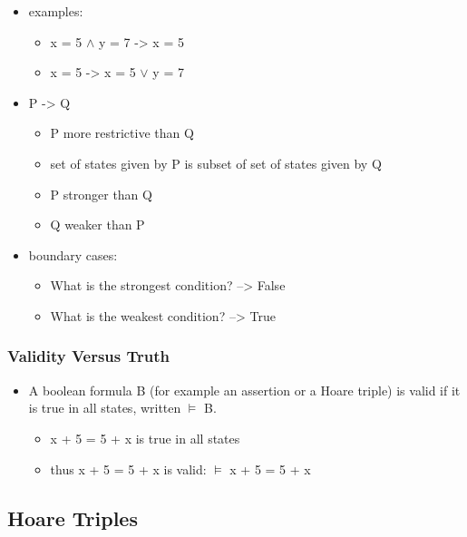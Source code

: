 \begin{itemize}
\tightlist
\item
  examples:

  \begin{itemize}
  \tightlist
  \item
    x = 5 $\land$ y = 7 -\textgreater{} x = 5
  \item
    x = 5 -\textgreater{} x = 5 $\lor$ y = 7
  \end{itemize}
\item
  P -\textgreater{} Q

  \begin{itemize}
  \tightlist
  \item
    P more restrictive than Q
  \item
    set of states given by P is subset of set of states given by Q
  \item
    P stronger than Q
  \item
    Q weaker than P
  \end{itemize}
\item
  boundary cases:

  \begin{itemize}
  \tightlist
  \item
    What is the strongest condition? --\textgreater{} False
  \item
    What is the weakest condition? --\textgreater{} True
  \end{itemize}
\end{itemize}

\hypertarget{validity-versus-truth}{%
\subsubsection{Validity Versus Truth}\label{validity-versus-truth}}

\begin{itemize}
\tightlist
\item
  A boolean formula B (for example an assertion or a Hoare triple) is
  valid if it is true in all states, written $\models$ B.

  \begin{itemize}
  \tightlist
  \item
    x + 5 = 5 + x is true in all states
  \item
    thus x + 5 = 5 + x is valid: $\models$ x + 5 = 5 + x
  \end{itemize}
\end{itemize}

\clearpage
\hypertarget{hoare-triples}{%
\subsection{Hoare Triples}\label{hoare-triples}}

